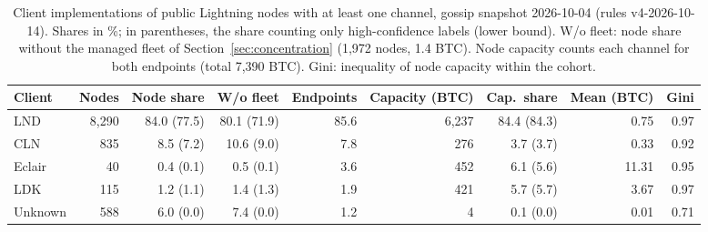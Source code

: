 \begin{table}[t]
\centering
\caption{Client implementations of public Lightning nodes with at least one channel, gossip snapshot 2026-10-04 (rules v4-2026-10-14). Shares in \%; in parentheses, the share
counting only high-confidence labels (lower bound). W/o fleet: node share without the managed fleet of
Section~\ref{sec:concentration} (1,972 nodes, 1.4 BTC). Node capacity counts each channel for both
endpoints (total 7,390 BTC). Gini: inequality of node capacity within the cohort.}
\label{tab:client-census}
\small
\begin{tabular}{lrrrrrrrr}
\toprule
Client & Nodes & Node share & W/o fleet & Endpoints & Capacity (BTC) & Cap.\ share & Mean (BTC) & Gini \\
\midrule
LND & 8,290 & 84.0 (77.5) & 80.1 (71.9) & 85.6 & 6,237 & 84.4 (84.3) & 0.75 & 0.97 \\
CLN & 835 & 8.5 (7.2) & 10.6 (9.0) & 7.8 & 276 & 3.7 (3.7) & 0.33 & 0.92 \\
Eclair & 40 & 0.4 (0.1) & 0.5 (0.1) & 3.6 & 452 & 6.1 (5.6) & 11.31 & 0.95 \\
LDK & 115 & 1.2 (1.1) & 1.4 (1.3) & 1.9 & 421 & 5.7 (5.7) & 3.67 & 0.97 \\
Unknown & 588 & 6.0 (0.0) & 7.4 (0.0) & 1.2 & 4 & 0.1 (0.0) & 0.01 & 0.71 \\
\bottomrule
\end{tabular}
\end{table}
